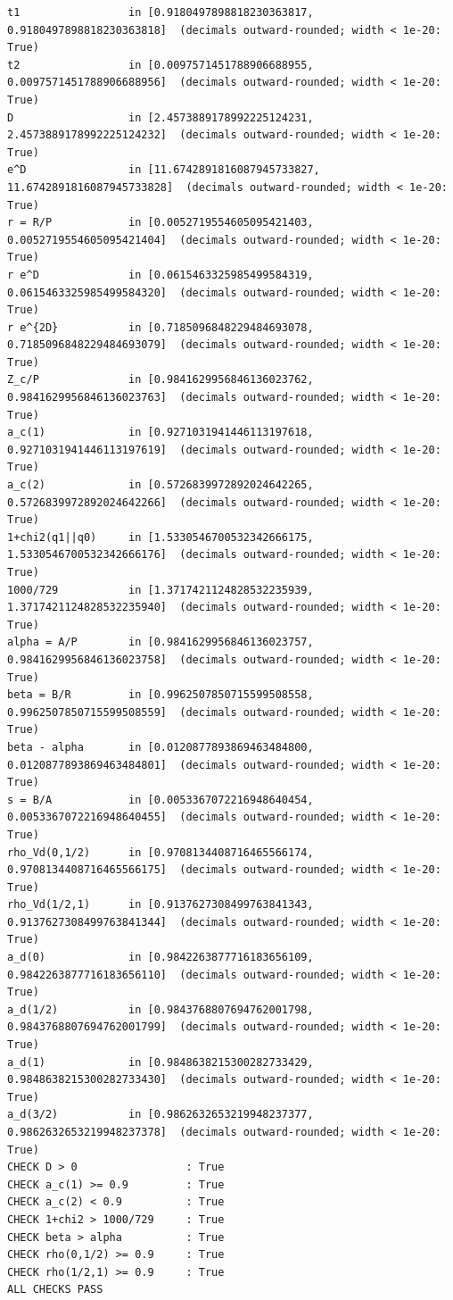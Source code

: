 \documentclass[11pt]{report}
\begin{document}
\begin{lstlisting}
t1                 in [0.9180497898818230363817, 0.9180497898818230363818]  (decimals outward-rounded; width < 1e-20: True)
t2                 in [0.0097571451788906688955, 0.0097571451788906688956]  (decimals outward-rounded; width < 1e-20: True)
D                  in [2.4573889178992225124231, 2.4573889178992225124232]  (decimals outward-rounded; width < 1e-20: True)
e^D                in [11.6742891816087945733827, 11.6742891816087945733828]  (decimals outward-rounded; width < 1e-20: True)
r = R/P            in [0.0052719554605095421403, 0.0052719554605095421404]  (decimals outward-rounded; width < 1e-20: True)
r e^D              in [0.0615463325985499584319, 0.0615463325985499584320]  (decimals outward-rounded; width < 1e-20: True)
r e^{2D}           in [0.7185096848229484693078, 0.7185096848229484693079]  (decimals outward-rounded; width < 1e-20: True)
Z_c/P              in [0.9841629956846136023762, 0.9841629956846136023763]  (decimals outward-rounded; width < 1e-20: True)
a_c(1)             in [0.9271031941446113197618, 0.9271031941446113197619]  (decimals outward-rounded; width < 1e-20: True)
a_c(2)             in [0.5726839972892024642265, 0.5726839972892024642266]  (decimals outward-rounded; width < 1e-20: True)
1+chi2(q1||q0)     in [1.5330546700532342666175, 1.5330546700532342666176]  (decimals outward-rounded; width < 1e-20: True)
1000/729           in [1.3717421124828532235939, 1.3717421124828532235940]  (decimals outward-rounded; width < 1e-20: True)
alpha = A/P        in [0.9841629956846136023757, 0.9841629956846136023758]  (decimals outward-rounded; width < 1e-20: True)
beta = B/R         in [0.9962507850715599508558, 0.9962507850715599508559]  (decimals outward-rounded; width < 1e-20: True)
beta - alpha       in [0.0120877893869463484800, 0.0120877893869463484801]  (decimals outward-rounded; width < 1e-20: True)
s = B/A            in [0.0053367072216948640454, 0.0053367072216948640455]  (decimals outward-rounded; width < 1e-20: True)
rho_Vd(0,1/2)      in [0.9708134408716465566174, 0.9708134408716465566175]  (decimals outward-rounded; width < 1e-20: True)
rho_Vd(1/2,1)      in [0.9137627308499763841343, 0.9137627308499763841344]  (decimals outward-rounded; width < 1e-20: True)
a_d(0)             in [0.9842263877716183656109, 0.9842263877716183656110]  (decimals outward-rounded; width < 1e-20: True)
a_d(1/2)           in [0.9843768807694762001798, 0.9843768807694762001799]  (decimals outward-rounded; width < 1e-20: True)
a_d(1)             in [0.9848638215300282733429, 0.9848638215300282733430]  (decimals outward-rounded; width < 1e-20: True)
a_d(3/2)           in [0.9862632653219948237377, 0.9862632653219948237378]  (decimals outward-rounded; width < 1e-20: True)
CHECK D > 0                 : True
CHECK a_c(1) >= 0.9         : True
CHECK a_c(2) < 0.9          : True
CHECK 1+chi2 > 1000/729     : True
CHECK beta > alpha          : True
CHECK rho(0,1/2) >= 0.9     : True
CHECK rho(1/2,1) >= 0.9     : True
ALL CHECKS PASS
\end{lstlisting}
\end{document}
